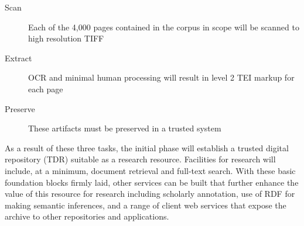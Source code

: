 
\begin{description}
  \item[Scan]{Each of the 4,000 pages contained in the corpus in scope will be scanned to high resolution TIFF}
  \item[Extract]{OCR and minimal human processing will result in level 2 TEI\cite{tei_sig_on_libraries_best_2011} markup for each page}
  \item[Preserve]{These artifacts must be preserved in a trusted system}
\end{description}

As a result of these three tasks, the initial phase will establish a trusted digital repository (TDR) suitable as a research resource. Facilities for research will include, at a minimum, document retrieval and full-text search. With these basic foundation blocks firmly laid, other services can be built that further enhance the value of this resource for research including scholarly annotation, use of RDF for making semantic inferences, and a range of client web services that expose the archive to other repositories and applications.
